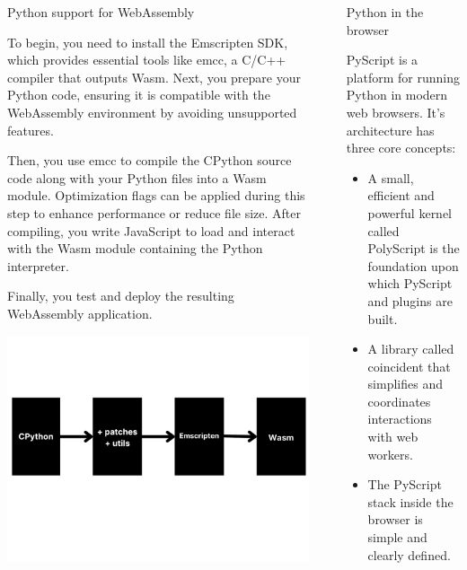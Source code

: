 \documentclass[final]{beamer}
\newlength{\sepwidth}
\newlength{\colwidth}
\newcommand{\separatorcolumn}{\begin{column}{\sepwidth}\end{column}}
\begin{document}
\begin{frame}[t]
\begin{columns}[t]
\begin{column}{\colwidth}
\begin{block}{Python support for WebAssembly}
          
          To begin, you need to install the Emscripten SDK, which provides essential tools like emcc, a C/C++ compiler that outputs Wasm. Next, you prepare your Python code, ensuring it is compatible with the WebAssembly environment by avoiding unsupported features. 
    
          
          Then, you use emcc to compile the CPython source code along with your Python files into a Wasm module. Optimization flags can be applied during this step to enhance performance or reduce file size. After compiling, you write JavaScript to load and interact with the Wasm module containing the Python interpreter. 
    
          
          Finally, you test and deploy the resulting WebAssembly application. 
    
            \includegraphics[width=1\linewidth]{figures/CPython.pdf}
    
    \end{block}
        \end{column}
            \separatorcolumn
        \begin{column}{\colwidth}
        
        \begin{block}{Python in the browser}
                \begin{minipage}[t]{\textwidth}
                    PyScript is a platform for running Python in modern web browsers. It's architecture has three core concepts:
                    \begin{itemize}
                    \item  A small, efficient and powerful kernel called PolyScript is the foundation upon which PyScript and plugins are built.
                    \item  A library called coincident that simplifies and coordinates interactions with web workers.
                    \item  The PyScript stack inside the browser is simple and clearly defined.


\end{itemize}
\end{minipage}
\end{block}
\end{column}
\end{columns}
\end{frame}
\end{document}
